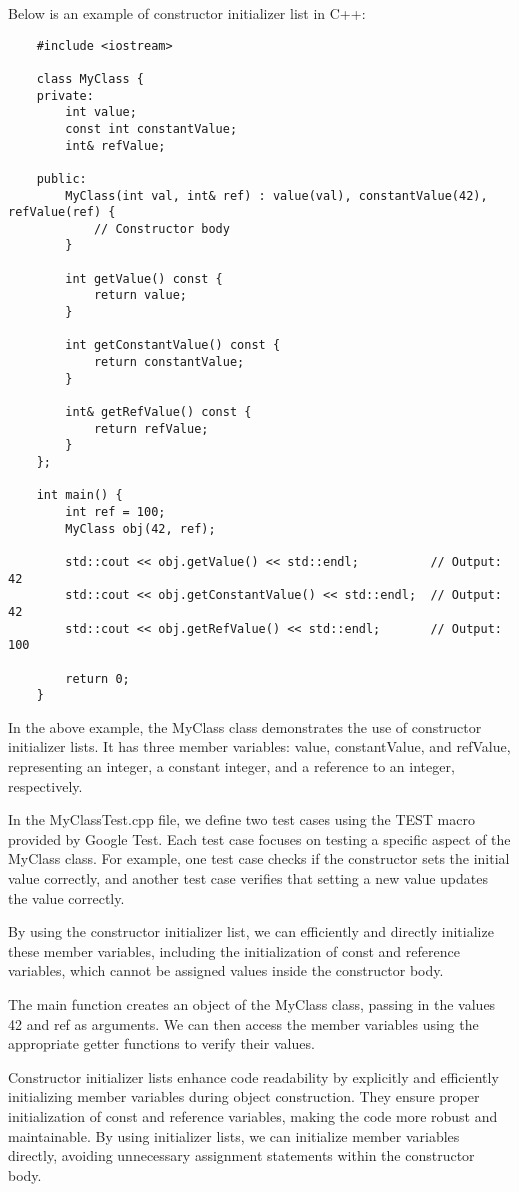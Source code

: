 \begin{solution}
    Below is an example of constructor initializer list in C++: \\
    \horizontalline
    \begin{verbatim}
    #include <iostream>

    class MyClass {
    private:
        int value;
        const int constantValue;
        int& refValue;
    
    public:
        MyClass(int val, int& ref) : value(val), constantValue(42), refValue(ref) {
            // Constructor body
        }
    
        int getValue() const {
            return value;
        }
    
        int getConstantValue() const {
            return constantValue;
        }
    
        int& getRefValue() const {
            return refValue;
        }
    };
    
    int main() {
        int ref = 100;
        MyClass obj(42, ref);
    
        std::cout << obj.getValue() << std::endl;          // Output: 42
        std::cout << obj.getConstantValue() << std::endl;  // Output: 42
        std::cout << obj.getRefValue() << std::endl;       // Output: 100
    
        return 0;
    }
    \end{verbatim}
    
    \horizontalline

    In the above example, the MyClass class demonstrates the use of constructor initializer lists. It has three member variables: value, constantValue, and refValue, representing an integer, a constant integer, and a reference to an integer, respectively.

    \noindent In the MyClassTest.cpp file, we define two test cases using the TEST macro provided by Google Test. Each test case focuses on testing a specific aspect of the MyClass class. For example, one test case checks if the constructor sets the initial value correctly, and another test case 
    verifies that setting a new value updates the value correctly.

    \noindent By using the constructor initializer list, we can efficiently and directly initialize these member variables, including the initialization of const and reference variables, which cannot be assigned values inside the constructor body.

    \noindent The main function creates an object of the MyClass class, passing in the values 42 and ref as arguments. We can then access the member variables using the appropriate getter functions to verify their values.

    \noindent Constructor initializer lists enhance code readability by explicitly and efficiently initializing member variables during object construction. They ensure proper initialization of const and reference variables, making the code more robust and maintainable. By using initializer lists, 
    we can initialize member variables directly, avoiding unnecessary assignment statements within the constructor body.
\end{solution}

